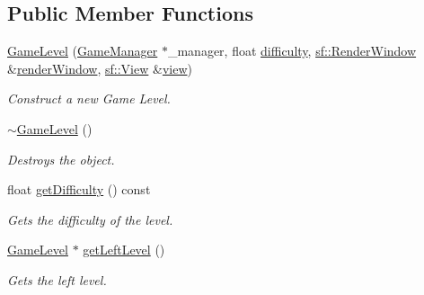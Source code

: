 \subsection*{Public Member Functions}
\begin{DoxyCompactItemize}
\item 
\mbox{\hyperlink{class_game_level_a4f4effafa8e36221e9591f2ef4e75654}{Game\+Level}} (\mbox{\hyperlink{class_game_manager}{Game\+Manager}} $\ast$\+\_\+manager, float \mbox{\hyperlink{class_game_level_a5caa9864a3102b53b702a40916386e6b}{difficulty}}, \mbox{\hyperlink{classsf_1_1_render_window}{sf\+::\+Render\+Window}} \&\mbox{\hyperlink{class_game_level_a5e146714542d8751848d859084cd9304}{render\+Window}}, \mbox{\hyperlink{classsf_1_1_view}{sf\+::\+View}} \&\mbox{\hyperlink{class_game_level_ab14291287fb33f81bc6ae8ba309fa170}{view}})
\begin{DoxyCompactList}\small\item\em Construct a new Game Level. \end{DoxyCompactList}\item 
\mbox{\label{class_game_level_a37af8f50cc369d630f0d51a4128c6ac4}} 
\mbox{\hyperlink{class_game_level_a37af8f50cc369d630f0d51a4128c6ac4}{$\sim$\+Game\+Level}} ()
\begin{DoxyCompactList}\small\item\em Destroys the object. \end{DoxyCompactList}\item 
\mbox{\label{class_game_level_ace9c7aabd1fd95869260c9d45b599ffd}} 
float \mbox{\hyperlink{class_game_level_ace9c7aabd1fd95869260c9d45b599ffd}{get\+Difficulty}} () const
\begin{DoxyCompactList}\small\item\em Gets the difficulty of the level. \end{DoxyCompactList}\item 
\mbox{\label{class_game_level_ab29beb748e571f1a5d077de3538d8f25}} 
\mbox{\hyperlink{class_game_level}{Game\+Level}} $\ast$ \mbox{\hyperlink{class_game_level_ab29beb748e571f1a5d077de3538d8f25}{get\+Left\+Level}} ()
\begin{DoxyCompactList}\small\item\em Gets the left level. \end{DoxyCompactList}\item 
\mbox{\label{class_game_level_a7f0054966f770ee68c49d7dbbbdf02f2}} 

\end{DoxyCompactItemize}
